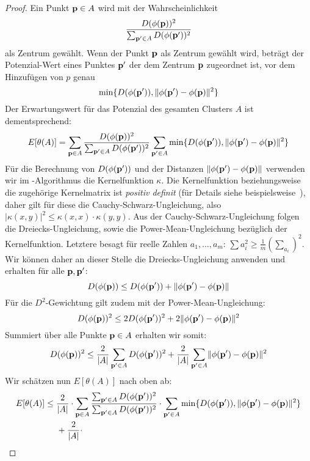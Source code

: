 \begin{proof}
	Ein Punkt $\mathbf{p} \in A$ wird mit der Wahrscheinlichkeit
	\[ \frac{D(\phi(\mathbf{p}))^2}{\sum_{\mathbf{p}' \in A} D(\phi(\mathbf{p}'))^2} \]
	als Zentrum gewählt. Wenn der Punkt $\mathbf{p}$ als Zentrum gewählt wird, beträgt der Potenzial-Wert eines Punktes $\mathbf{p'}$
	der dem Zentrum $\mathbf{p}$ zugeordnet ist, vor dem Hinzufügen von $p$ genau
	\[ \min \{ D(\phi(\mathbf{p}')), \lVert {\phi(\ensuremath{\mathbf{p}}')} - {\phi(\mathbf{p})} \rVert^2 \} \]
	Der Erwartungswert für das Potenzial des gesamten Clusters $A$ ist dementsprechend:
	\[  E[\theta(A)] = \sum_{\mathbf{p} \in A} \frac{D(\phi(\mathbf{p}))^2}{\sum_{\mathbf{p}' \in A} D(\phi(\mathbf{p}'))^2}
		\sum_{\mathbf{p}' \in A} \min \{ D(\phi(\mathbf{p}')), \lVert {\phi(\ensuremath{\mathbf{p}}')} - {\phi(\mathbf{p})} \rVert^2 \} \]
	Für die Berechnung von $D(\phi(\mathbf{p}'))$ und der Distanzen $\lVert {\phi(\ensuremath{\mathbf{p}}')} - {\phi(\mathbf{p})} \rVert$ verwenden
	wir im \kkmpp-Algorithmus die Kernelfunktion $\kappa$. Die Kernelfunktion beziehungsweise die zugehörige
	Kernelmatrix ist \emph{positiv definit} (für Details siehe beispielsweise~\cite{Shawe-TaylorC04}), daher gilt für diese die
	Cauchy-Schwarz-Ungleichung, also $\left|\kappa(x,y)\right|^2 \leq \kappa(x,x) \cdot \kappa(y,y)$.
	Aus der Cauchy-Schwarz-Ungleichung folgen die Dreiecks-Ungleichung, sowie die Power-Mean-Ungleichung bezüglich der
	Kernelfunktion. Letztere besagt für reelle Zahlen $a_1, \dots, a_m$:
	$\sum a_i^2 \geq \frac{1}{m} \left( \sum_{a_i} \right)^2$. Wir können daher an
	dieser Stelle die Dreiecks-Ungleichung anwenden und erhalten für alle $\mathbf{p}, \mathbf{p}'$:
	\[ D(\phi(\mathbf{p})) \leq D(\phi(\mathbf{p}')) + \lVert {\phi(\ensuremath{\mathbf{p}}')} - {\phi(\mathbf{p})} \rVert \]
	Für die $D^2$-Gewichtung gilt zudem mit der Power-Mean-Ungleichung:
	\[ D(\phi(\mathbf{p}))^2 \leq 2 D(\phi(\mathbf{p}'))^2 + 2 \lVert {\phi(\ensuremath{\mathbf{p}}')} - {\phi(\mathbf{p})} \rVert^2 \]
	Summiert über alle Punkte $\mathbf{p} \in A$ erhalten wir somit:
	\[ D(\phi(\mathbf{p}))^2 \leq \frac{2}{\left|A\right|} \sum_{\mathbf{p}' \in A} D(\phi(\mathbf{p}'))^2
		+ \frac{2}{\left|A\right|} \sum_{\mathbf{p}' \in A} \lVert {\phi(\ensuremath{\mathbf{p}}')} - {\phi(\mathbf{p})} \rVert^2 \]
	Wir schätzen nun $E[\theta(A)]$ nach oben ab:
	\begin{align*}
		E[\theta(A)] 	&\leq \frac{2}{\left|A\right|} \cdot \sum_{\vect{p} \in A} \frac{\sum_{\vect{p}' \in A} D(\phi(\vect{p}'))^2}{\sum_{\vect{p}' \in A} D(\phi(\vect{p}'))^2}
								\cdot \sum_{\vect{p}' \in A} \min \{ D(\phi(\vect{p}')), \EuclidSquared{\phi(\vect{p}')}{\phi(\vect{p})} \} \\
						& \; \; \; \; \; + \frac{2}{\left|A\right|} \cdot

\end{align*}
\end{proof}
